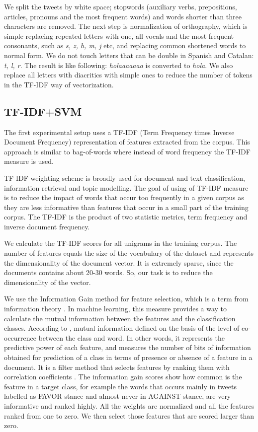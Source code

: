 \documentclass[10pt, a4paper]{article}
\begin{document}
We split the tweets by white space; stopwords (auxiliary verbs, prepositions, articles, pronouns and the most frequent words) and words shorter than three characters are removed. The next step is normalization of orthography, which is simple replacing repeated letters with one, all vocals and the most frequent consonants, such as \textit{s, z, h, m, j} etc, and replacing common shortened words to normal form. We do not touch letters that can be double in Spanish and Catalan: \textit{t, l, r}.  The result is like following: \textit{holaaaaaaa} is converted to \textit{hola}. We also replace all letters with diacritics with simple ones to reduce the number of tokens in the TF-IDF way of vectorization. 

\subsection{TF-IDF+SVM}

The first experimental setup uses a TF-IDF (Term Frequency times Inverse Document Frequency) \cite{Jones72astatistical} representation of features extracted from the corpus. This approach is similar to bag-of-words where instead of word frequency the TF-IDF measure is used.

TF-IDF weighting scheme is broadly used for document and text classification, information retrieval and topic modelling. The goal of using of TF-IDF measure is to reduce the impact of words that occur too frequently in a given corpus as they are less informative than features that occur in a small part of the training corpus. The TF-IDF is the product of two statistic metrics, term frequency  and inverse document frequency.

We calculate the TF-IDF scores for all unigrams in the training corpus. The number of features equals the size of the vocabulary of the dataset and represents the dimensionality of the document vector. It is extremely sparse, since the documents contains about 20-30 words. So, our task is to reduce the dimensionality of the vector. 

We use the Information Gain method for feature selection, which is a term from information theory \cite{Cover:2006:EIT:1146355}. In machine learning, this measure provides a way to calculate the mutual information between the features and the classification classes. According to \cite{Aggarwal12}, mutual information defined on the basis of the level of co-occurrence between the class and word. In other words, it represents the predictive power of each feature, and measures the number of bits of information obtained for prediction of a class in terms of presence or absence of a feature in a document. It is a filter method that selects features by ranking them with correlation coefficients \cite{guyon03}. The information gain scores show how common is the feature in a target class, for example the words that occurs mainly in tweets labelled as FAVOR stance and almost never in AGAINST stance, are very informative and ranked highly. All the weights are normalized and all the features ranked from one to zero. We then select those features that are scored larger than zero.
\end{document}
